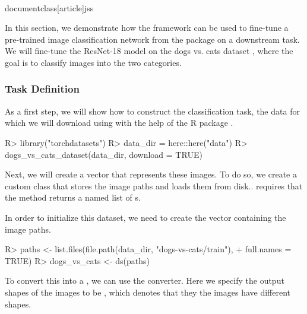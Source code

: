 \\documentclass[article]{jss}
\theoremstyle{definition}
\begin{document}
In this section, we demonstrate how the  framework can be used to fine-tune a pre-trained image classification network from the  package on a downstream task.
We will fine-tune the ResNet-18 model \citep{ref-he2015deepresiduallearningimage} on the dogs vs. cats dataset \citep{ref-dogs-vs-cats2013}, where the goal is to classify images into the two categories.

\subsubsection{Task Definition}

As a first step, we will show how to construct the classification task, the data for which we will download using with the help of the  R package \citep{torchdatasets}.

\begin{CodeInput}
R> library("torchdatasets")
R> data_dir = here::here("data")
R> dogs_vs_cats_dataset(data_dir, download = TRUE)
\end{CodeInput}

Next, we will create a  vector that represents these images.
To do so, we create a custom  class that stores the image paths and loads them from disk..
 requires that the  method returns a named list of s.


In order to initialize this dataset, we need to create the vector containing the image paths.

\begin{CodeInput}
R> paths <- list.files(file.path(data_dir, "dogs-vs-cats/train"),
+    full.names = TRUE)
R> dogs_vs_cats <- ds(paths)
\end{CodeInput}

To convert this into a , we can use the  converter.
Here we specify the output shapes of the images to be , which denotes that they the images have different shapes.
\end{document}
